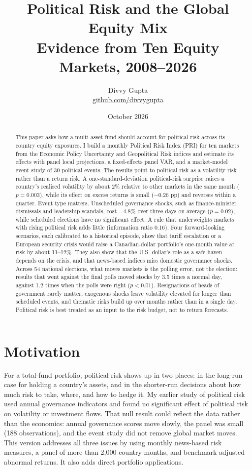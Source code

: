 \documentclass[11pt]{article}
\title{\textbf{Political Risk and the Global Equity Mix}\\[4pt]
\large Evidence from Ten Equity Markets, 2008--2026}
\author{Divvy Gupta\\ \small\href{https://github.com/divvygupta}{github.com/divvygupta}}
\date{October 2026}
\begin{document}
\maketitle

\begin{abstract}
\noindent This paper asks how a multi-asset fund should account for political risk across its country equity exposures. I build a monthly Political Risk Index (PRI) for ten markets from the Economic Policy Uncertainty and Geopolitical Risk indices and estimate its effects with panel local projections, a fixed-effects panel VAR, and a market-model event study of 30 political events. The results point to political risk as a volatility risk rather than a return risk. A one-standard-deviation political-risk surprise raises a country's realised volatility by about 2\% relative to other markets in the same month ($p = 0.003$), while its effect on excess returns is small ($-0.26$ pp) and reverses within a quarter. Event type matters. Unscheduled governance shocks, such as finance-minister dismissals and leadership scandals, cost $-4.8\%$ over three days on average ($p = 0.02$), while scheduled elections have no significant effect. A rule that underweights markets with rising political risk adds little (information ratio 0.16). Four forward-looking scenarios, each calibrated to a historical episode, show that tariff escalation or a European security crisis would raise a Canadian-dollar portfolio's one-month value at risk by about 11--12\%. They also show that the U.S. dollar's role as a safe haven depends on the crisis, and that news-based indices miss domestic governance shocks. Across 54 national elections, what moves markets is the polling error, not the election: results that went against the final polls moved stocks by 3.5 times a normal day, against 1.2 times when the polls were right ($p < 0.01$). Resignations of heads of government rarely matter, exogenous shocks leave volatility elevated for longer than scheduled events, and thematic risks build up over months rather than in a single day. Political risk is best treated as an input to the risk budget, not to return forecasts.
\end{abstract}

\section{Motivation}
For a total-fund portfolio, political risk shows up in two places: in the long-run case for holding a country's assets, and in the shorter-run decisions about how much risk to take, where, and how to hedge it. My earlier study of political risk used annual governance indicators and found no significant effect of political risk on volatility or investment flows. That null result could reflect the data rather than the economics: annual governance scores move slowly, the panel was small (188 observations), and the event study did not remove global market moves. This version addresses all three issues by using monthly news-based risk measures, a panel of more than 2,000 country-months, and benchmark-adjusted abnormal returns. It also adds direct portfolio applications.
\end{document}
